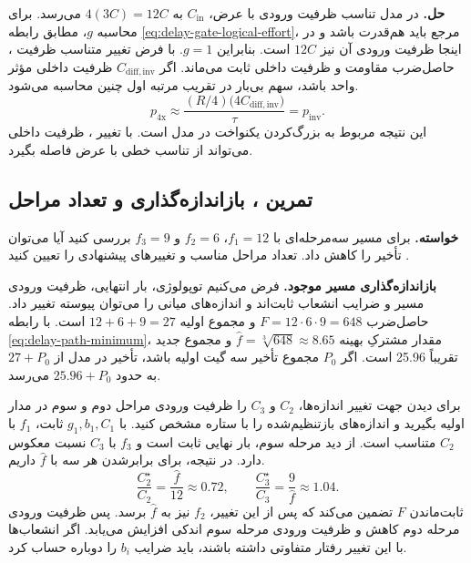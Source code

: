 \textbf{حل.}
در مدل تناسب ظرفیت ورودی با عرض، \(C_{\mathrm{in}}\) به
\(4(3C)=12C\) می‌رسد. برای محاسبه \(g\)،
مطابق رابطه \eqref{eq:delay-gate-logical-effort}، مرجع باید  هم‌قدرت باشد و در اینجا ظرفیت ورودی آن نیز
\(12C\) است. بنابراین \(g=1\). با فرض تغییر متناسب ظرفیت
، حاصل‌ضرب مقاومت و ظرفیت داخلی ثابت می‌ماند.
اگر \(C_{\mathrm{diff,inv}}\) ظرفیت داخلی مؤثر
 واحد باشد، سهم بی‌بار در تقریب مرتبه اول
چنین محاسبه می‌شود.
\[
  p_{\mathrm{4x}}\approx
  \frac{(R/4)\bigl(4C_{\mathrm{diff,inv}}\bigr)}{\tau}
  =p_{\mathrm{inv}}.
\]
این نتیجه مربوط به بزرگ‌کردن یکنواخت در مدل  است.
با تغییر ، ظرفیت داخلی می‌تواند از تناسب خطی
با عرض فاصله بگیرد.

\subsection{تمرین ، بازاندازه‌گذاری و تعداد مراحل}
\label{sec:delay-exercise-stage-count}

\textbf{خواسته.}
برای مسیر سه‌مرحله‌ای با \(f_1=12\)، \(f_2=6\) و \(f_3=9\)
بررسی کنید آیا می‌توان تأخیر را کاهش داد. تعداد مراحل مناسب و
تغییرهای پیشنهادی را تعیین کنید
\cite[تمرین ، صفحه ۱۷۷]{weste}.

\textbf{بازاندازه‌گذاری مسیر موجود.}
فرض می‌کنیم توپولوژی، بار انتهایی، ظرفیت ورودی مسیر و ضرایب
انشعاب ثابت‌اند و اندازه‌های میانی را می‌توان پیوسته تغییر داد.
حاصل‌ضرب \(F=12\cdot6\cdot9=648\) و مجموع اولیه
\(12+6+9=27\) است.
با رابطه \eqref{eq:delay-path-minimum}، مقدار مشترکِ بهینه \(\widehat f=\sqrt[3]{648}\approx8.65\)
و مجموع جدید تقریباً \num{25.96} است. اگر \(P_0\) مجموع
تأخیر  سه گیت اولیه باشد، تأخیر در مدل از
\(27+P_0\) به حدود \(25.96+P_0\) می‌رسد.

برای دیدن جهت تغییر اندازه‌ها، \(C_2\) و \(C_3\) را ظرفیت
ورودی مراحل دوم و سوم در مدار اولیه بگیرید و اندازه‌های
بازتنظیم‌شده را با ستاره مشخص کنید. با \(g_1,b_1,C_1\)
ثابت، \(f_1\) با \(C_2\) متناسب است. از دید مرحله سوم،
بار نهایی ثابت است و \(f_3\) با \(C_3\) نسبت معکوس دارد.
در نتیجه، برای برابرشدن هر سه  با
\(\widehat f\) داریم.
\[
  \frac{C_2^\star}{C_2}=\frac{\widehat f}{12}\approx0.72,
  \qquad
  \frac{C_3^\star}{C_3}=\frac{9}{\widehat f}\approx1.04.
\]
ثابت‌ماندن \(F\) تضمین می‌کند که پس از این تغییر، \(f_2\)
نیز به \(\widehat f\) برسد. پس ظرفیت ورودی مرحله دوم
کاهش و ظرفیت ورودی مرحله سوم اندکی افزایش می‌یابد. اگر
انشعاب‌ها با این تغییر رفتار متفاوتی داشته باشند، باید
ضرایب \(b_i\) را دوباره حساب کرد.

